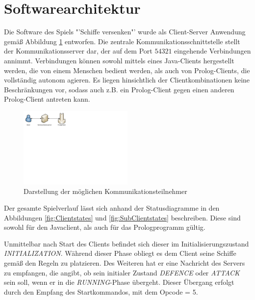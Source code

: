 \section{Softwarearchitektur} \label{sec:Softwarearchitektur}


Die Software des Spiels "'Schiffe versenken"' wurde als Client-Server Anwendung gemäß Abbildung \ref{fig:Kommunikationsteilnehmer} entworfen.
Die zentrale Kommunikationsschnittstelle stellt der Kommunikationsserver dar, der auf dem Port $54321$ eingehende Verbindungen annimmt.
Verbindungen können sowohl mittels eines Java-Clients hergestellt werden, die von einem Menschen bedient werden, als auch von Prolog-Clients, die vollständig autonom agieren.
Es liegen hinsichtlich der Clientkombinationen keine Beschränkungen vor, sodass auch z.B. ein Prolog-Client gegen einen anderen Prolog-Client antreten kann.

\begin{figure}[H]
  \centering
  \includegraphics[trim=0mm 165mm 175mm 0mm,clip,width=0.5\textwidth]{images/Kommunikationsmodell.pdf}
  \caption{Darstellung der möglichen Kommunikationsteilnehmer}
  \label{fig:Kommunikationsteilnehmer}
\end{figure}

Der gesamte Spielverlauf lässt sich anhand der Statusdiagramme in den Abbildungen \ref{fig:Clientstates} und \ref{fig:SubClientstates} beschreiben.
Diese sind sowohl für den Javaclient, als auch für das Prologprogramm gültig.

Unmittelbar nach Start des Clients befindet sich dieser im Initialisierungszustand \emph{INITIALIZATION}.
Während dieser Phase obliegt es dem Client seine Schiffe gemäß den Regeln zu platzieren.
Des Weiteren hat er eine Nachricht des Servers zu empfangen, die angibt, ob sein initialer Zustand \emph{DEFENCE} oder \emph{ATTACK} sein soll, wenn er in die \emph{RUNNING}-Phase übergeht.
Dieser Übergang erfolgt durch den Empfang des Startkommandos, mit dem Opcode = 5.

